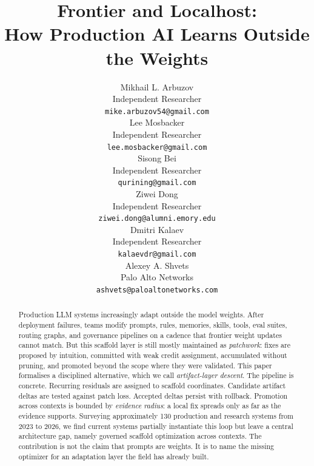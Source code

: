 \documentclass{article}
\title{Frontier and Localhost:\\How Production AI Learns Outside the Weights}
\author{%
  Mikhail L. Arbuzov\\
  Independent Researcher\\
  \texttt{mike.arbuzov54@gmail.com}\\
  \And
  Lee Mosbacker\\
  Independent Researcher\\
  \texttt{lee.mosbacker@gmail.com}\\
  \And
  Sisong Bei\\
  Independent Researcher\\
  \texttt{qurining@gmail.com}\\
  \AND
  Ziwei Dong\\
  Independent Researcher\\
  \texttt{ziwei.dong@alumni.emory.edu}\\
  \And
  Dmitri Kalaev\\
  Independent Researcher\\
  \texttt{kalaevdr@gmail.com}\\
  \And
  Alexey A. Shvets\\
  Palo Alto Networks\\
  \texttt{ashvets@paloaltonetworks.com}\\
}
\begin{document}
\maketitle

\begin{abstract}
Production LLM systems increasingly adapt outside the model weights. After deployment failures, teams modify prompts, rules, memories, skills, tools, eval suites, routing graphs, and governance pipelines on a cadence that frontier weight updates cannot match. But this scaffold layer is still mostly maintained as \emph{patchwork}: fixes are proposed by intuition, committed with weak credit assignment, accumulated without pruning, and promoted beyond the scope where they were validated. This paper formalises a disciplined alternative, which we call \emph{artifact-layer descent}. The pipeline is concrete. Recurring residuals are assigned to scaffold coordinates. Candidate artifact deltas are tested against patch loss. Accepted deltas persist with rollback. Promotion across contexts is bounded by \emph{evidence radius}: a local fix spreads only as far as the evidence supports. Surveying approximately 130 production and research systems from 2023 to 2026, we find current systems partially instantiate this loop but leave a central architecture gap, namely governed scaffold optimization across contexts. The contribution is not the claim that prompts are weights. It is to name the missing optimizer for an adaptation layer the field has already built.
\end{abstract}



\nocite{*}



% 
\end{document}
